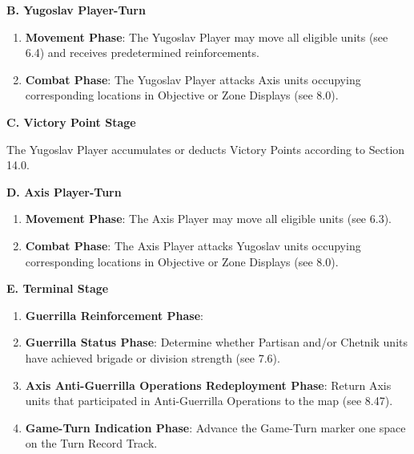 \textbf{B. Yugoslav Player-Turn}

\begin{enumerate}
  \item \textbf{Movement Phase}: The Yugoslav Player may move all eligible
  units (see 6.4) and receives predetermined reinforcements.
  \item \textbf{Combat Phase}: The Yugoslav Player attacks Axis units occupying
  corresponding locations in Objective or Zone Displays (see 8.0).
\end{enumerate}

\textbf{C. Victory Point Stage}

The Yugoslav Player accumulates or deducts Victory Points according to Section
14.0.

\textbf{D. Axis Player-Turn}

\begin{enumerate}
  \item \textbf{Movement Phase}: The Axis Player may move all eligible units
  (see 6.3).
  \item \textbf{Combat Phase}: The Axis Player attacks Yugoslav units occupying
  corresponding locations in Objective or Zone Displays (see 8.0).
\end{enumerate}

\textbf{E. Terminal Stage}

\begin{enumerate}
  \item \textbf{Guerrilla Reinforcement Phase}:
  \item \textbf{Guerrilla Status Phase}: Determine whether Partisan and/or
  Chetnik units have achieved brigade or division strength (see 7.6).
  \item \textbf{Axis Anti-Guerrilla Operations Redeployment Phase}: Return Axis
  units that participated in Anti-Guerrilla Operations to the map (see 8.47).
  \item \textbf{Game-Turn Indication Phase}: Advance the Game-Turn marker one
  space on the Turn Record Track.
\end{enumerate}
